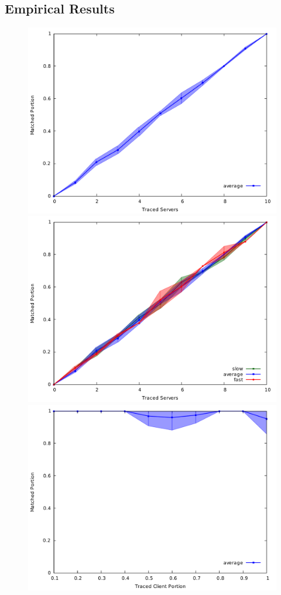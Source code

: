 \subsection{Empirical Results}
\begin{figure}[H]
\centering
\includegraphics[scale=0.35]{graphs/s_server_mport_average_only.pdf}
\includegraphics[scale=0.35]{graphs/s_server_mport.pdf}
\includegraphics[scale=0.35]{graphs/c_tclient_mport_average_only.pdf}

\end{figure}
